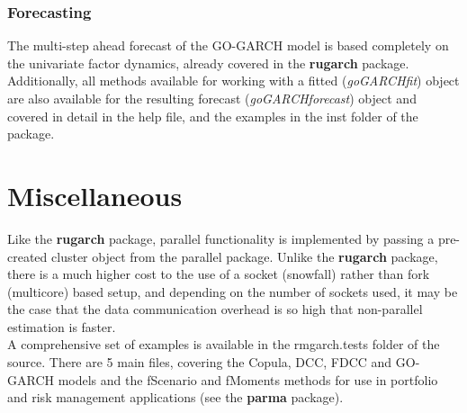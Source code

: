 \subsubsection{Forecasting}
The multi-step ahead forecast of the GO-GARCH model is based completely on the
univariate factor dynamics, already covered in the {\bf {rugarch}} package.
Additionally, all methods available for working with a fitted (\emph{goGARCHfit})
object are also available for the resulting forecast (\emph{goGARCHforecast})
object and covered in detail in the help file, and the examples in the inst
folder of the package.

\section{Miscellaneous}
Like the {\bf rugarch} package, parallel functionality is implemented by passing a
pre-created cluster object from the parallel package. Unlike the {\bf rugarch}
package, there is a much higher cost to the use of a socket (snowfall) rather than
fork (multicore) based setup, and depending on the number of sockets used, it may be
the case that the data communication overhead is so high that non-parallel estimation
is faster.\\
A comprehensive set of examples is available in the rmgarch.tests folder of the source.
There are 5 main files, covering the Copula, DCC, FDCC and GO-GARCH models and the fScenario
and fMoments methods for use in portfolio and risk management applications (see the {\bf parma}
package).\\
\clearpage
\appendixpage
\addappheadtotoc
